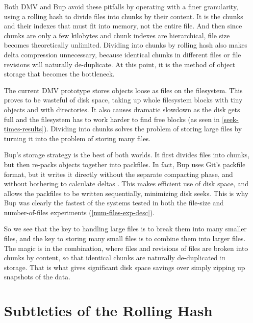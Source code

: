 Both \gls{DMV} and Bup avoid these pitfalls by operating with a finer
granularity, using a rolling hash to divide files into chunks by their content.
It is the chunks and their indexes that must fit into memory, not the entire
file. And then since chunks are only a few kilobytes and chunk indexes are
hierarchical, file size becomes theoretically unlimited. Dividing into chunks by
rolling hash also makes delta compression unnecessary, because identical chunks
in different files or file revisions will naturally de-duplicate. At this point,
it is the method of object storage that becomes the bottleneck.

The current \gls{DMV} prototype stores objects loose as files on the filesystem.
This proves to be wasteful of disk space, taking up whole filesystem blocks with
tiny objects and with directories. It also causes dramatic slowdown as the disk
gets full and the filesystem has to work harder to find free blocks (as seen in
\autoref{seek-times-results}). Dividing into chunks solves the problem of
storing large files by turning it into the problem of storing many files.

Bup's storage strategy is the best of both worlds. It first divides files into
chunks, but then re-packs objects together into \glspl{packfile}. In fact, Bup
uses Git's \gls{packfile} format\footnotemark, but it writes it directly without
the separate compacting phase, and without bothering to calculate deltas
\cite{bup_design}. This makes efficient use of disk space, and allows the
\glspl{packfile} to be written sequentially, minimizing disk seeks. This is why
Bup was clearly the fastest of the systems tested in both the file-size and
number-of-files experiments (\autoref{num-files-exp-desc}).


So we see that the key to handling large files is to break them into many
smaller files, and the key to storing many small files is to combine them into
larger files. The magic is in the combination, where files and revisions of
files are broken into chunks by content, so that identical chunks are naturally
de-duplicated in storage. That is what gives significant disk space savings over
simply zipping up snapshots of the data.

%


\section{Subtleties of the Rolling Hash}

